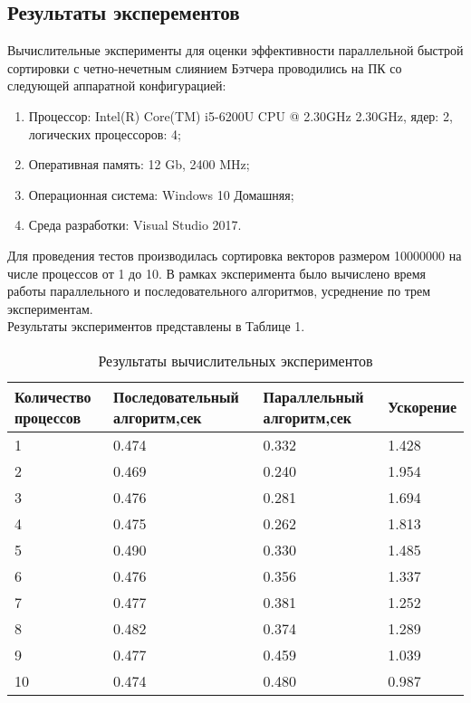 \documentclass[a4paper]{report}
\begin{document}
\begin{center}
\section*{Результаты эксперементов}
\end{center}
\par Вычислительные эксперименты для оценки эффективности параллельной быстрой сортировки с четно-нечетным слиянием Бэтчера проводились на ПК со следующей аппаратной конфигурацией:
\begin{enumerate}
\item Процессор: Intel(R) Core(TM) i5-6200U CPU @ 2.30GHz 2.30GHz, ядер: 2, логических процессоров: 4;
\item Оперативная память: 12 Gb, 2400 MHz;
\item Операционная система: Windows 10 Домашняя;
\item Среда разработки: Visual Studio 2017.
\end{enumerate}
\par Для проведения тестов производилась сортировка векторов размером 10000000 на числе процессов от 1 до 10.
В рамках эксперимента было вычислено время работы параллельного и последовательного алгоритмов, усреднение по трем экспериментам.\\
Результаты экспериментов представлены в Таблице 1.
\begin{table}[!h]
\caption{Результаты вычислительных экспериментов}
\centering
\begin{tabular}{|p{3cm}|p{4cm}|p{4cm}|p{3cm}|}
\hline
Количество процессов & Последовательный алгоритм,сек & Параллельный алгоритм,сек & Ускорение  \\\hline
1  & 0.474 & 0.332 & 1.428  \\\hline
2  & 0.469 & 0.240 & 1.954  \\\hline
3  & 0.476 & 0.281 & 1.694  \\\hline
4  & 0.475 & 0.262 & 1.813  \\\hline
5  & 0.490 & 0.330 & 1.485  \\\hline
6  & 0.476 & 0.356 & 1.337  \\\hline
7  & 0.477 & 0.381 & 1.252  \\\hline
8  & 0.482 & 0.374 & 1.289  \\\hline
9  & 0.477 & 0.459 & 1.039  \\\hline
10 & 0.474 & 0.480 & 0.987  \\
\hline
\end{tabular}
\end{table}
\end{document}
